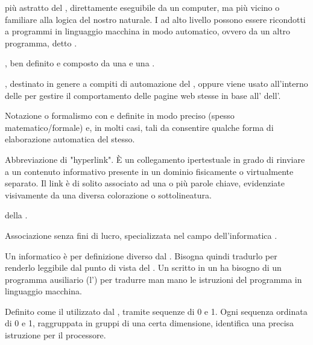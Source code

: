 { più astratto del , direttamente eseguibile da un computer, ma più vicino o familiare alla logica del nostro  naturale. I  ad alto livello possono essere ricondotti a programmi in linguaggio macchina in modo automatico, ovvero da un altro programma, detto .}

{, ben definito e composto da una  e una .}

{, destinato in genere a compiti di automazione del , oppure viene usato all'interno delle  per gestire il comportamento delle pagine web stesse in base all'  dell'.}

{Notazione o formalismo con  e  definite in modo preciso (spesso matematico/formale) e, in molti casi, tali da consentire qualche forma di elaborazione automatica del  stesso.}

{Abbreviazione di "hyperlink". \`{E} un collegamento ipertestuale in grado di rinviare a un contenuto informativo presente in un dominio fisicamente o virtualmente separato. Il link è di solito associato ad una o più parole chiave, evidenziate visivamente da una diversa colorazione o sottolineatura.}

{ della .}

{Associazione senza fini di lucro, specializzata nel campo dell'informatica .}

{Un  informatico è per definizione diverso dal . Bisogna quindi tradurlo per renderlo leggibile dal punto di vista del . Un  scritto in un  ha bisogno di un programma ausiliario (l') per tradurre man mano le istruzioni del programma in linguaggio macchina.}

{Definito come il  utilizzato dal , tramite sequenze di 0 e 1. Ogni sequenza ordinata di 0 e 1, raggruppata in gruppi di una certa dimensione, identifica una precisa istruzione per il processore.}

